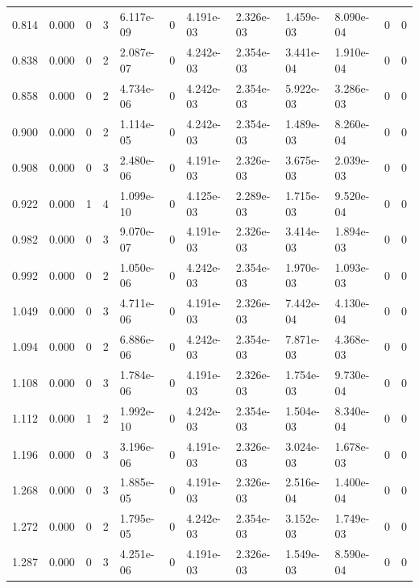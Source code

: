 \documentclass[preview]{standalone}
\begin{document}
{{\begin{tabular}{L{1.2cm}C{1.2cm} C{0.3cm}C{0.5cm} C{1.4cm}C{1.4cm} C{1.4cm}C{1.4cm} C{1.6cm}C{1.6cm} C{1.6cm}C{1.6cm}}
  0.814  &  0.000  & 0     &  3 &  6.117e-09  & 0  &  4.191e-03&   2.326e-03& 1.459e-03 & 8.090e-04   &  0 & 0  \\ 
  0.838  &  0.000  & 0     &  2 &  2.087e-07  & 0  &  4.242e-03&   2.354e-03& 3.441e-04 & 1.910e-04   &  0 & 0  \\ 
  0.858  &  0.000  & 0     &  2 &  4.734e-06  & 0  &  4.242e-03&   2.354e-03& 5.922e-03 & 3.286e-03   &  0 & 0  \\ 
  0.900  &  0.000  & 0     &  2 &  1.114e-05  & 0  &  4.242e-03&   2.354e-03& 1.489e-03 & 8.260e-04   &  0 & 0  \\ 
  0.908  &  0.000  & 0     &  3 &  2.480e-06  & 0  &  4.191e-03&   2.326e-03& 3.675e-03 & 2.039e-03   &  0 & 0  \\ 
  0.922  &  0.000  & 1     &  4 &  1.099e-10  & 0  &  4.125e-03&   2.289e-03& 1.715e-03 & 9.520e-04   &  0 & 0  \\ 
  0.982  &  0.000  & 0     &  3 &  9.070e-07  & 0  &  4.191e-03&   2.326e-03& 3.414e-03 & 1.894e-03   &  0 & 0  \\ 
  0.992  &  0.000  & 0     &  2 &  1.050e-06  & 0  &  4.242e-03&   2.354e-03& 1.970e-03 & 1.093e-03   &  0 & 0  \\ 
  1.049  &  0.000  & 0     &  3 &  4.711e-06  & 0  &  4.191e-03&   2.326e-03& 7.442e-04 & 4.130e-04   &  0 & 0  \\ 
  1.094  &  0.000  & 0     &  2 &  6.886e-06  & 0  &  4.242e-03&   2.354e-03& 7.871e-03 & 4.368e-03   &  0 & 0  \\ 
  1.108  &  0.000  & 0     &  3 &  1.784e-06  & 0  &  4.191e-03&   2.326e-03& 1.754e-03 & 9.730e-04   &  0 & 0  \\ 
  1.112  &  0.000  & 1     &  2 &  1.992e-10  & 0  &  4.242e-03&   2.354e-03& 1.504e-03 & 8.340e-04   &  0 & 0  \\ 
  1.196  &  0.000  & 0     &  3 &  3.196e-06  & 0  &  4.191e-03&   2.326e-03& 3.024e-03 & 1.678e-03   &  0 & 0  \\ 
  1.268  &  0.000  & 0     &  3 &  1.885e-05  & 0  &  4.191e-03&   2.326e-03& 2.516e-04 & 1.400e-04   &  0 & 0  \\ 
  1.272  &  0.000  & 0     &  2 &  1.795e-05  & 0  &  4.242e-03&   2.354e-03& 3.152e-03 & 1.749e-03   &  0 & 0  \\ 
  1.287  &  0.000  & 0     &  3 &  4.251e-06  & 0  &  4.191e-03&   2.326e-03& 1.549e-03 & 8.590e-04   &  0 & 0  \\ 
\hline 
\end{tabular} 

}}
\end{document}
